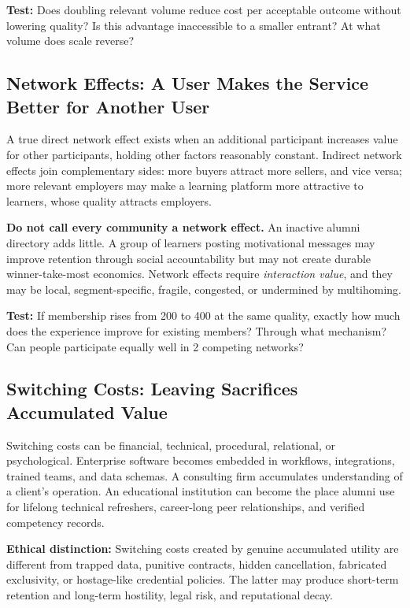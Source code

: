 \textbf{Test:} Does doubling relevant volume reduce cost per acceptable outcome without lowering quality? Is this advantage inaccessible to a smaller entrant? At what volume does scale reverse?

\subsection{Network Effects: A User Makes the Service Better for Another User}
\label{sec:network_effects}

A true direct network effect exists when an additional participant increases value for other participants, holding other factors reasonably constant. Indirect network effects join complementary sides: more buyers attract more sellers, and vice versa; more relevant employers may make a learning platform more attractive to learners, whose quality attracts employers.

\textbf{Do not call every community a network effect.} An inactive alumni directory adds little. A group of learners posting motivational messages may improve retention through social accountability but may not create durable winner-take-most economics. Network effects require \textit{interaction value}, and they may be local, segment-specific, fragile, congested, or undermined by multihoming.

\textbf{Test:} If membership rises from 200 to 400 at the same quality, exactly how much does the experience improve for existing members? Through what mechanism? Can people participate equally well in 2 competing networks?

\subsection{Switching Costs: Leaving Sacrifices Accumulated Value}
\label{sec:switching_costs}

Switching costs can be financial, technical, procedural, relational, or psychological. Enterprise software becomes embedded in workflows, integrations, trained teams, and data schemas. A consulting firm accumulates understanding of a client's operation. An educational institution can become the place alumni use for lifelong technical refreshers, career-long peer relationships, and verified competency records.

\textbf{Ethical distinction:} Switching costs created by genuine accumulated utility are different from trapped data, punitive contracts, hidden cancellation, fabricated exclusivity, or hostage-like credential policies. The latter may produce short-term retention and long-term hostility, legal risk, and reputational decay.

